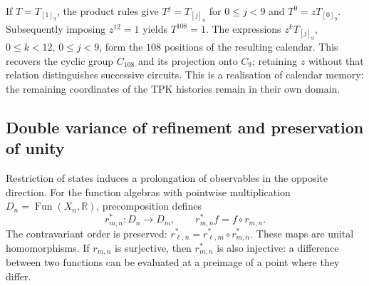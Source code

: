 If \(T=T_{[1]_9}\), the product rules give
\(T^j=T_{[j]_9}\) for \(0\le j<9\) and \(T^9=zT_{[0]_9}\).
Subsequently imposing \(z^{12}=1\) yields \(T^{108}=1\).
The expressions \(z^kT_{[j]_9}\), \(0\le k<12\), \(0\le j<9\),
form the \(108\) positions of the resulting calendar. This recovers
the cyclic group \(C_{108}\) and its projection onto \(C_9\); retaining
\(z\) without that relation distinguishes successive circuits. This is a
realisation of calendar memory: the remaining coordinates of
the TPK histories remain in their own domain.

\subsection{Double variance of refinement and preservation of unity}
\label{hist:doble-varianza}

Restriction of states induces a prolongation of observables in the opposite
direction. For the function algebras with pointwise multiplication
\(D_n=\operatorname{Fun}(X_n,\mathbb R)\), precomposition defines
\begin{equation}
 r_{m,n}^*:D_n\longrightarrow D_m,
 \qquad r_{m,n}^*f=f\circ r_{m,n}.
 \label{vi:hist:precomposicion}
\end{equation}
The contravariant order is preserved:
\(r_{\ell,n}^*=r_{\ell,m}^*\circ r_{m,n}^*\). These maps
are unital homomorphisms. If \(r_{m,n}\) is surjective, then
\(r_{m,n}^*\) is also injective: a difference between two functions can be
evaluated at a preimage of a point where they differ.

